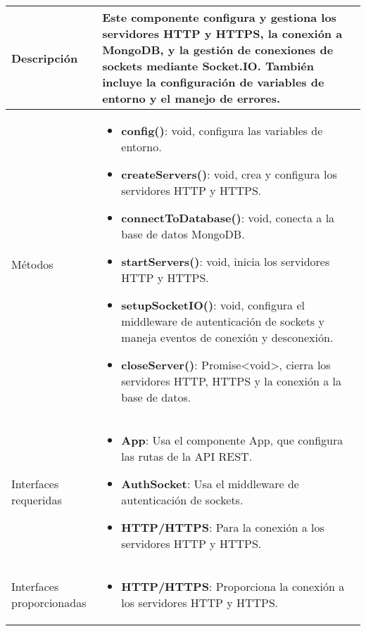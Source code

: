 \begin{longtable}{
    >{\columncolor{lightgreen!20}}p{4cm}
    p{12cm}
    }
    \midrule
    Descripción & Este componente configura y gestiona los servidores HTTP y HTTPS, la conexión a MongoDB, y la gestión de conexiones de sockets mediante Socket.IO. También incluye la configuración de variables de entorno y el manejo de errores. \\
    \midrule
    Métodos & \begin{itemize}[nosep,leftmargin=*]
      \item \textbf{config()}: void, configura las variables de entorno.
      \item \textbf{createServers()}: void, crea y configura los servidores HTTP y HTTPS.
      \item \textbf{connectToDatabase()}: void, conecta a la base de datos MongoDB.
      \item \textbf{startServers()}: void, inicia los servidores HTTP y HTTPS.
      \item \textbf{setupSocketIO()}: void, configura el middleware de autenticación de sockets y maneja eventos de conexión y desconexión.
      \item \textbf{closeServer()}: Promise<void>, cierra los servidores HTTP, HTTPS y la conexión a la base de datos.
    \end{itemize} \\
    \midrule
    Interfaces requeridas & \begin{itemize}[nosep,leftmargin=*]
      \item \textbf{App}: Usa el componente App, que configura las rutas de la API REST.
      \item \textbf{AuthSocket}: Usa el middleware de autenticación de sockets.
      \item \textbf{HTTP/HTTPS}: Para la conexión a los servidores HTTP y HTTPS.
    \end{itemize} \\
    \midrule
    Interfaces proporcionadas & \begin{itemize}[nosep,leftmargin=*]
      \item \textbf{HTTP/HTTPS}: Proporciona la conexión a los servidores HTTP y HTTPS.
    \end{itemize} \\
\end{longtable}


